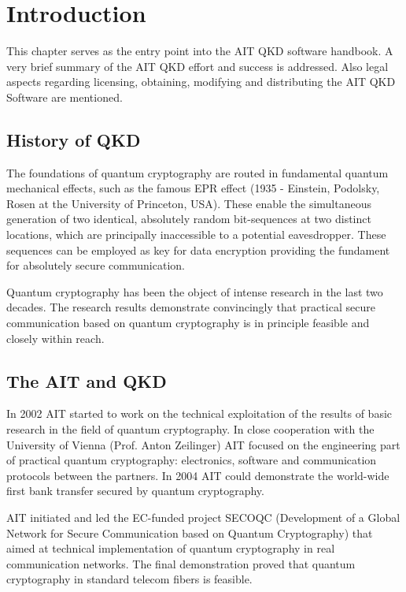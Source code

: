 \chapter{Introduction}
\label{chap:Introduction}

This chapter serves as the entry point into the AIT QKD software handbook. A very brief summary of the AIT QKD effort and success is addressed. Also legal aspects regarding licensing, obtaining, modifying and distributing the AIT QKD Software are mentioned.


\section{History of QKD}
\label{sec:History of QKD}

The foundations of quantum cryptography are routed in fundamental quantum mechanical effects, such as the famous EPR effect (1935 - Einstein, Podolsky, Rosen at the University of Princeton, USA). These enable the simultaneous generation of two identical, absolutely random bit-sequences at two distinct locations, which are principally inaccessible to a potential eavesdropper. These sequences can be employed as key for data encryption providing the fundament for absolutely secure communication.

\medskip

Quantum cryptography has been the object of intense research in the last two decades. The research results demonstrate convincingly that practical secure communication based on quantum cryptography is in principle feasible and closely within reach.


\section{The AIT and QKD}
\label{sec:The AIT and QKD}

In 2002 AIT started to work on the technical exploitation of the results of basic research in the field of quantum cryptography. In close cooperation with the University of Vienna (Prof. Anton Zeilinger) AIT focused on the engineering part of practical quantum cryptography: electronics, software and communication protocols between the partners. In 2004 AIT could demonstrate the world-wide first bank transfer secured by quantum cryptography.

\medskip

AIT initiated and led the EC-funded project SECOQC (Development of a Global Network for Secure Communication based on Quantum Cryptography) that aimed at technical implementation of quantum cryptography in real communication networks. The final demonstration proved that quantum cryptography in standard telecom fibers is feasible.

